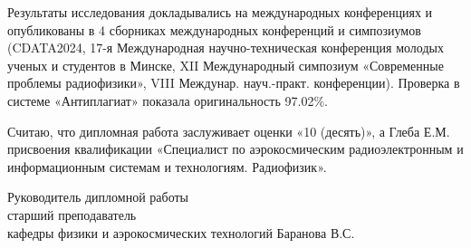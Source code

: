 \documentclass[14pt, a4paper]{bsu_review}
\begin{document}
Результаты исследования докладывались на международных конференциях и опубликованы в 4 сборниках международных конференций и симпозиумов (CDATA2024, 17-я Международная научно-техническая конференция молодых ученых и студентов в Минске, XII Международный симпозиум «Современные проблемы радиофизики», VIII Междунар. науч.-практ. конференции). Проверка в системе «Антиплагиат» показала оригинальность 97.02\%.

Считаю, что дипломная работа заслуживает оценки «10 (десять)», а Глеба Е.М. присвоения квалификации «Специалист по аэрокосмическим радиоэлектронным и информационным системам и технологиям. Радиофизик».

\vspace{1cm}

\noindent Руководитель дипломной работы\\
старший преподаватель\\
кафедры физики и аэрокосмических технологий
 \hfill Баранова В.С.
\end{document}
